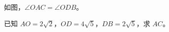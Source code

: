 \documentclass{exam-zh}
\begin{document}

\begin{problem}[points=10]
  \noindent
  \begin{minipage}[t]{\dimexpr\linewidth-60mm-6mm\relax}
    \vspace{0pt}
    如图，$\angle OAC=\angle ODB$。

已知 $AO=2\sqrt{2}$，$OD=4\sqrt{5}$，$DB=2\sqrt{5}$，求 $AC$。
    
  \end{minipage}\hfill
  \begin{diagramcoltikz}{60mm}{先用对顶角补齐第二组等角，再按顶点顺序配边。}
  }
  \end{diagramcoltikz}
  \par\medskip
  \answerarea[48mm]
\end{problem}
\end{document}
